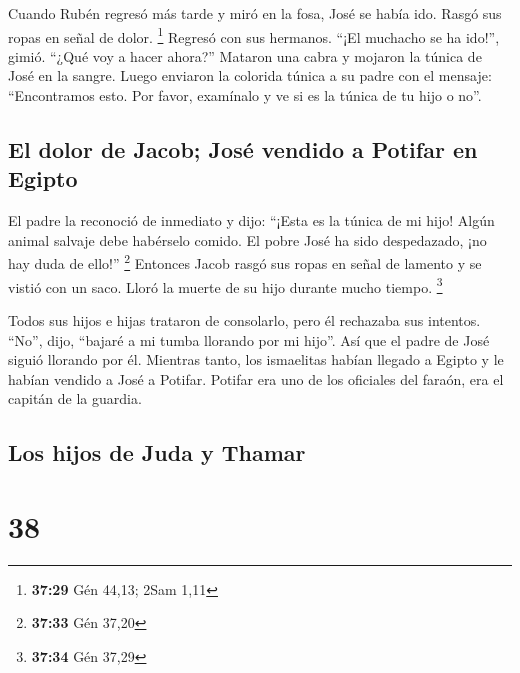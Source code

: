  Cuando Rubén regresó más tarde y miró en la fosa, José
se había ido. Rasgó sus ropas en señal de dolor. \footnote{\textbf{37:29}
  Gén 44,13; 2Sam 1,11}  Regresó con sus hermanos. ``¡El
muchacho se ha ido!'', gimió. ``¿Qué voy a hacer ahora?''
 Mataron una cabra y mojaron la túnica de José en la
sangre.  Luego enviaron la colorida túnica a su padre con
el mensaje: ``Encontramos esto. Por favor, examínalo y ve si es la
túnica de tu hijo o no''.

\hypertarget{el-dolor-de-jacob-josuxe9-vendido-a-potifar-en-egipto}{%
\subsection{El dolor de Jacob; José vendido a Potifar en
Egipto}\label{el-dolor-de-jacob-josuxe9-vendido-a-potifar-en-egipto}}

 El padre la reconoció de inmediato y dijo: ``¡Esta es la
túnica de mi hijo! Algún animal salvaje debe habérselo comido. El pobre
José ha sido despedazado, ¡no hay duda de ello!'' \footnote{\textbf{37:33}
  Gén 37,20}  Entonces Jacob rasgó sus ropas en señal de
lamento y se vistió con un saco. Lloró la muerte de su hijo durante
mucho tiempo. \footnote{\textbf{37:34} Gén 37,29}

 Todos sus hijos e hijas trataron de consolarlo, pero él
rechazaba sus intentos. ``No'', dijo, ``bajaré a mi tumba llorando por
mi hijo''. Así que el padre de José siguió llorando por él.
 Mientras tanto, los ismaelitas habían llegado a Egipto y
le habían vendido a José a Potifar. Potifar era uno de los oficiales del
faraón, era el capitán de la guardia.

\hypertarget{los-hijos-de-juda-y-thamar}{%
\subsection{Los hijos de Juda y
Thamar}\label{los-hijos-de-juda-y-thamar}}

\hypertarget{section-37}{%
\section{38}\label{section-37}}

